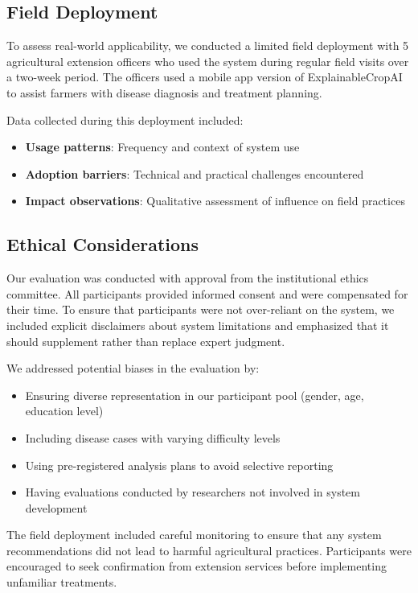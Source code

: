 \subsection{Field Deployment}

To assess real-world applicability, we conducted a limited field deployment with 5 agricultural extension officers who used the system during regular field visits over a two-week period. The officers used a mobile app version of ExplainableCropAI to assist farmers with disease diagnosis and treatment planning.

Data collected during this deployment included:

\begin{itemize}
    \item \textbf{Usage patterns}: Frequency and context of system use
    \item \textbf{Adoption barriers}: Technical and practical challenges encountered
    \item \textbf{Impact observations}: Qualitative assessment of influence on field practices
\end{itemize}

\subsection{Ethical Considerations}

Our evaluation was conducted with approval from the institutional ethics committee. All participants provided informed consent and were compensated for their time. To ensure that participants were not over-reliant on the system, we included explicit disclaimers about system limitations and emphasized that it should supplement rather than replace expert judgment.

We addressed potential biases in the evaluation by:

\begin{itemize}
    \item Ensuring diverse representation in our participant pool (gender, age, education level)
    \item Including disease cases with varying difficulty levels
    \item Using pre-registered analysis plans to avoid selective reporting
    \item Having evaluations conducted by researchers not involved in system development
\end{itemize}

The field deployment included careful monitoring to ensure that any system recommendations did not lead to harmful agricultural practices. Participants were encouraged to seek confirmation from extension services before implementing unfamiliar treatments.
